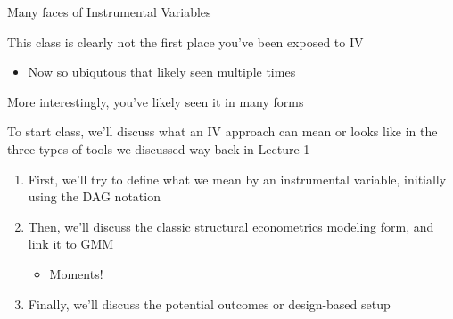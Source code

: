 \documentclass[notes,11pt, aspectratio=169]{beamer}
\newenvironment{wideitemize}{\itemize\addtolength{\itemsep}{10pt}}{\enditemize}
\begin{document}
\begin{frame}{Many faces of Instrumental Variables}
  \begin{wideitemize}
  \item  This class is clearly not the first place you've been exposed to IV
    \begin{itemize}
    \item Now so ubiqutous that likely seen multiple times
    \end{itemize}
  \item More interestingly, you've likely seen it in many forms
  \item To start class, we'll discuss what an IV approach can mean or
    looks like in the three types of tools we discussed way back in
    Lecture 1
    \begin{enumerate}
  \item First, we'll try to define what we mean by an instrumental
    variable, initially using the DAG notation
  \item Then, we'll discuss the classic structural econometrics
    modeling form, and link it to GMM
    \begin{itemize}
    \item Moments!
    \end{itemize}
  \item Finally, we'll discuss the potential outcomes or design-based
    setup
    \end{enumerate}
  \end{wideitemize}
\end{frame}
\end{document}
